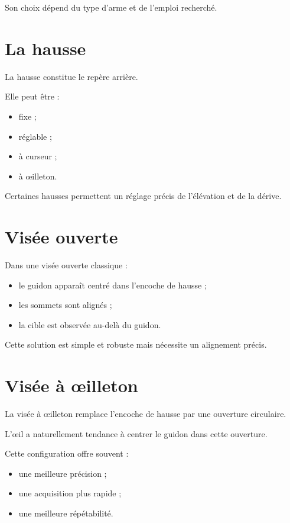 Son choix dépend du type d'arme et de l'emploi recherché.

\section{La hausse}

La hausse constitue le repère arrière.

Elle peut être :

\begin{itemize}
    \item fixe ;
    \item réglable ;
    \item à curseur ;
    \item à œilleton.
\end{itemize}

Certaines hausses permettent un réglage précis de l'élévation et de la
dérive.

\section{Visée ouverte}

Dans une visée ouverte classique :

\begin{itemize}
    \item le guidon apparaît centré dans l'encoche de hausse ;
    \item les sommets sont alignés ;
    \item la cible est observée au-delà du guidon.
\end{itemize}

Cette solution est simple et robuste mais nécessite un alignement précis.

\section{Visée à œilleton}

La visée à œilleton remplace l'encoche de hausse par une ouverture
circulaire.

L'œil a naturellement tendance à centrer le guidon dans cette ouverture.

Cette configuration offre souvent :

\begin{itemize}
    \item une meilleure précision ;
    \item une acquisition plus rapide ;
    \item une meilleure répétabilité.
\end{itemize}

